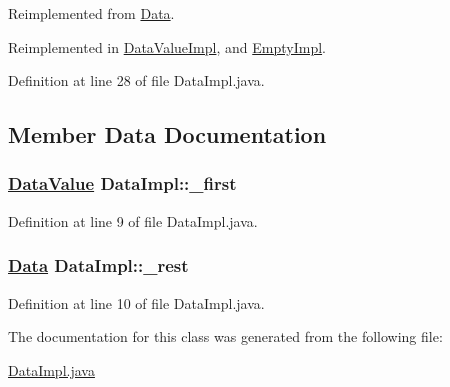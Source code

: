 Reimplemented from \hyperlink{interfaceData_a1}{Data}.

Reimplemented in \hyperlink{classDataValueImpl_a2}{Data\-Value\-Impl}, and \hyperlink{classEmptyImpl_a3}{Empty\-Impl}.

Definition at line 28 of file Data\-Impl.java.

\subsection{Member Data Documentation}
\hypertarget{classDataImpl_n0}{
\subsubsection[\_\-first]{\setlength{\rightskip}{0pt plus 5cm}\hyperlink{interfaceDataValue}{Data\-Value} Data\-Impl::\_\-first}}
\label{classDataImpl_n0}




Definition at line 9 of file Data\-Impl.java.\hypertarget{classDataImpl_n1}{
\subsubsection[\_\-rest]{\setlength{\rightskip}{0pt plus 5cm}\hyperlink{interfaceData}{Data} Data\-Impl::\_\-rest}}
\label{classDataImpl_n1}




Definition at line 10 of file Data\-Impl.java.

The documentation for this class was generated from the following file:\begin{CompactItemize}
\item 
\hyperlink{DataImpl_8java-source}{Data\-Impl.java}\end{CompactItemize}
